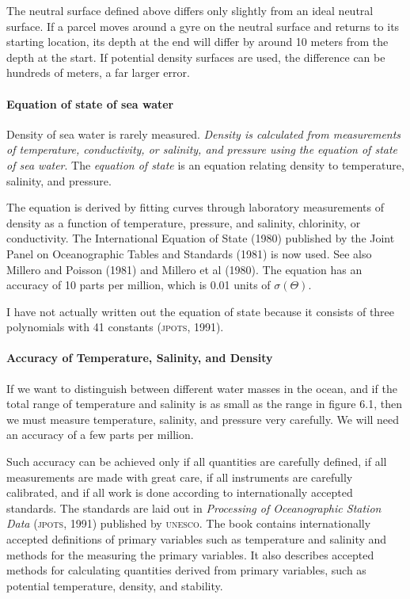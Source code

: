 The neutral surface defined above differs only slightly from an ideal neutral
surface. If a parcel moves around a gyre on the neutral surface and returns to its
starting location, its depth at the end will differ by around 10 meters from the
depth at the start. If potential density surfaces are used, the difference can be
hundreds of meters, a far larger error.

\paragraph{Equation of state of sea water}
Density
of sea water is rarely measured.
\textit{Density is calculated from measurements of temperature, conductivity,
or salinity, and pressure using the equation of state of sea water}. The
\textit{equation of state} is an equation relating density to temperature, salinity,
and pressure.

The equation is derived by fitting curves through laboratory measurements of
density as a function of temperature, pressure, and salinity, chlorinity, or
conductivity. The International Equation of State (1980) published by the Joint
Panel on Oceanographic Tables and Standards (1981) is now used. See also
Millero and Poisson (1981) and Millero et al (1980). The equation has an
accuracy of 10 parts per million, which is 0.01 units of
$\sigma(\Theta)$.

I have not actually written out the equation of state because it consists of
three polynomials with 41 constants (\textsc{jpots}, 1991).

\paragraph{Accuracy of Temperature, Salinity, and Density}
 If we want
to distinguish between different water masses in the ocean, and if
the total range of temperature and salinity is as small as the
range in figure 6.1, then we must measure temperature, salinity,
and pressure very carefully. We will need an accuracy of a few
parts per million.

Such accuracy can be achieved only if all quantities are carefully
defined, if all measurements are made with great care, if all
instruments are carefully calibrated, and if all work is done
according to internationally accepted standards. The standards are
laid out in \textit{Processing of Oceanographic Station
Data}
(\textsc{jpots}, 1991) published by \textsc{unesco}. The book
contains internationally accepted definitions of primary variables
such as temperature and salinity and methods for the measuring the
primary variables. It also describes accepted methods for
calculating quantities derived from primary variables, such as
potential temperature, density, and stability.

